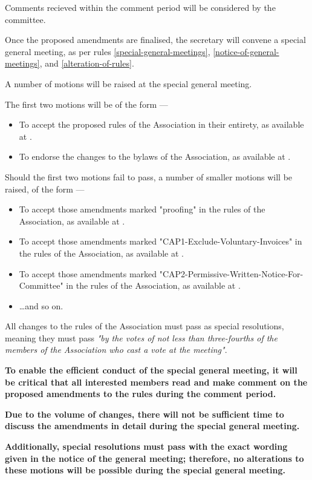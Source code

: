 \documentclass[../constitution.tex]{subfiles}
\begin{document}
Comments recieved within the comment period will be considered by the committee.



\bigskip

Once the proposed amendments are finalised, the secretary will convene a special general meeting, as per rules \ref{special-general-meetings}, \ref{notice-of-general-meetings}, and \ref{alteration-of-rules}.

\bigskip

A number of motions will be raised at the special general meeting.

The first two motions will be of the form ---

\begin{itemize}
    \item To accept the proposed rules of the Association in their entirety, as available at .
    \item To endorse the changes to the bylaws of the Association, as available at .
\end{itemize}

\bigskip

Should the first two motions fail to pass, a number of smaller motions will be raised, of the form ---

\begin{itemize}
    \item To accept those amendments marked "proofing" in the rules of the Association, as available at .
    \item To accept those amendments marked "CAP1-Exclude-Voluntary-Invoices" in the rules of the Association, as available at .
    \item To accept those amendments marked "CAP2-Permissive-Written-Notice-For-Committee" in the rules of the Association, as available at .
    \item \dots and so on.
\end{itemize}

All changes to the rules of the Association must pass as special resolutions, meaning they must pass \textit{"by the votes of not less than three-fourths of the members of the Association who cast a vote at the meeting"}.

\bigskip

\textbf{To enable the efficient conduct of the special general meeting, it will be critical that all interested members read and make comment on the proposed amendments to the rules during the comment period.}

\textbf{Due to the volume of changes, there will not be sufficient time to discuss the amendments in detail during the special general meeting.}

\textbf{Additionally, special resolutions must pass with the exact wording given in the notice of the general meeting; therefore, no alterations to these motions will be possible during the special general meeting.}
\end{document}
